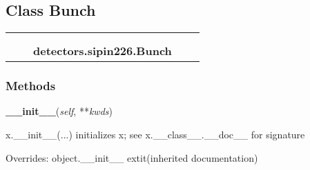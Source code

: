
\subsection{Class Bunch}

    \label{detectors:sipin226:Bunch}
\begin{tabular}{cccccc}
\multicolumn{2}{r}{\settowidth{\BCL}{object}\multirow{2}{\BCL}{object}}
&&
  \\\cline{3-3}
  &&\multicolumn{1}{c|}{}
&&
  \\
&&\multicolumn{2}{l}{\textbf{detectors.sipin226.Bunch}}
\end{tabular}



  \subsubsection{Methods}

    \vspace{0.5ex}

    \begin{boxedminipage}{\textwidth}

    \raggedright \textbf{\_\_init\_\_}(\textit{self}, **\textit{kwds})

    x.\_\_init\_\_(...) initializes x; see x.\_\_class\_\_.\_\_doc\_\_ for 
    signature

    \vspace{1ex}

      Overrides: object.\_\_init\_\_ 	extit{(inherited documentation)}

    \end{boxedminipage}

    \label{object:__delattr__}

    \vspace{0.5ex}

